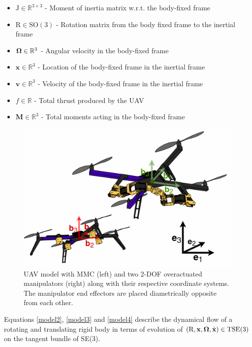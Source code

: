 \begin{itemize}
	\item $\text{J} \in \mathbb{R}^{3 \times 3}$ - Moment of inertia matrix w.r.t. the body-fixed frame
	
	\item $\text{R} \in \text{SO}(3)$ - Rotation matrix from the body fixed frame to the inertial frame
	
	\item $\boldsymbol{\Omega} \in \mathbb{R}^3$ - Angular velocity in the body-fixed frame
	
	\item $\textbf{x} \in \mathbb{R}^3$ - Location of the body-fixed frame in the inertial frame
	
	\item $\textbf{v} \in \mathbb{R}^3$ - Velocity of the body-fixed frame in the inertial frame
	
	\item $f \in \mathbb{R}$ - Total thrust produced by the UAV
	
	\item $\textbf{M} \in \mathbb{R}^3$ - Total moments acting in the body-fixed frame
\end{itemize}
\begin{figure}
	\includegraphics[width=\columnwidth]{pictures/uav.png}	
	\centering
	\caption{UAV model with MMC (left) and two 2-DOF overactuated manipulators (right) along with their respective coordinate systems. The manipulator end effectors are placed diametrically opposite from each other.}
	\label{fig:uav_model}
\end{figure}
\noindent Equations \eqref{model2}, \eqref{model3} and \eqref{model4} describe the dynamical flow of a rotating and translating rigid body in terms of evolution of $(\text{R},\textbf{x},\boldsymbol{\Omega},\dot{\textbf{x}})\in \text{TSE}(3)$ on the tangent bundle of SE(3). 

